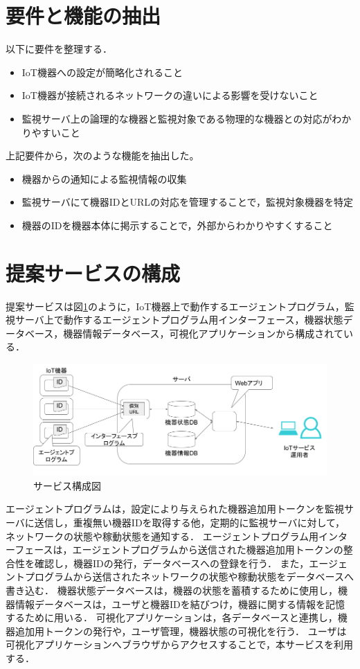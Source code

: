 \section{要件と機能の抽出}
以下に要件を整理する．
\begin{itemize}
\item IoT機器への設定が簡略化されること
\item IoT機器が接続されるネットワークの違いによる影響を受けないこと
\item 監視サーバ上の論理的な機器と監視対象である物理的な機器との対応がわかりやすいこと
\end{itemize}

上記要件から，次のような機能を抽出した。
\begin{itemize}
\item 機器からの通知による監視情報の収集
\item 監視サーバにて機器IDとURLの対応を管理することで，監視対象機器を特定
\item 機器のIDを機器本体に掲示することで，外部からわかりやすくすること
\end{itemize}

\section{提案サービスの構成}
提案サービスは図\ref{fig:blockdiagram}のように，IoT機器上で動作するエージェントプログラム，監視サーバ上で動作するエージェントプログラム用インターフェース，機器状態データベース，機器情報データベース，可視化アプリケーションから構成されている．
\begin{figure}[htbp]
\includegraphics[width=16cm]{images/prop_diag.png}
\caption{サービス構成図}
\label{fig:blockdiagram}
\end{figure}
エージェントプログラムは，設定により与えられた機器追加用トークンを監視サーバに送信し，重複無い機器IDを取得する他，定期的に監視サーバに対して，ネットワークの状態や稼動状態を通知する．
エージェントプログラム用インターフェースは，エージェントプログラムから送信された機器追加用トークンの整合性を確認し，機器IDの発行，データベースへの登録を行う．
また，エージェントプログラムから送信されたネットワークの状態や稼動状態をデータベースへ書き込む．
機器状態データベースは，機器の状態を蓄積するために使用し，機器情報データベースは，ユーザと機器IDを結びつけ，機器に関する情報を記憶するために用いる．
可視化アプリケーションは，各データベースと連携し，機器追加用トークンの発行や，ユーザ管理，機器状態の可視化を行う．
ユーザは可視化アプリケーションへブラウザからアクセスすることで，本サービスを利用する．

